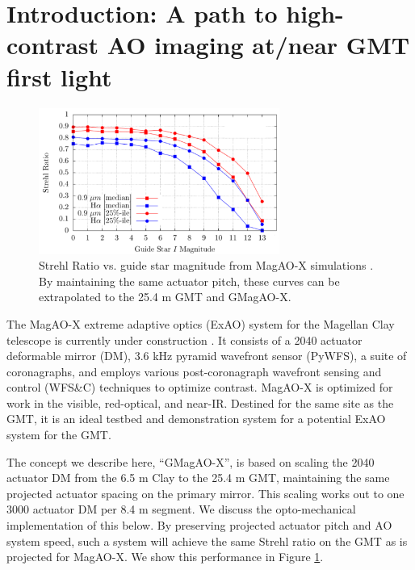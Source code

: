 \documentclass[12pt,preprint]{aastex}
\begin{document}
\section{Introduction: A path to high-contrast AO imaging at/near GMT first light} \label{sec:intro}

\begin{figure}
\centering
\vspace{-0.3in}
\includegraphics[width=3.1in]{figures/fig1.png}
\vspace{-0.1in}
\caption{ Strehl Ratio vs. guide star magnitude from MagAO-X simulations \citep{2018SPIE10703E..09M}.  By maintaining the same actuator pitch, these curves can be extrapolated to the 25.4 m GMT and GMagAO-X. \label{fig:strehl} }
\end{figure}

The MagAO-X extreme adaptive optics (ExAO) system for the Magellan Clay telescope is currently under construction \citep{2018SPIE10703E..09M, 2018SPIE10703E..4YC}.  It consists of a 2040 actuator deformable mirror (DM), 3.6 kHz pyramid wavefront sensor (PyWFS), a suite of coronagraphs, and employs various post-coronagraph wavefront sensing and control (WFS\&C) techniques to optimize contrast.  MagAO-X is optimized for work in the visible, red-optical, and near-IR.  Destined for the same site as the GMT, it is an ideal testbed and demonstration system for a potential ExAO system for the GMT.

The concept we describe here, ``GMagAO-X'', is based on scaling the 2040 actuator DM from the 6.5 m Clay to the 25.4 m GMT, maintaining the same projected actuator spacing on the primary mirror.  This scaling works out to one 3000 actuator DM per 8.4 m segment.  We discuss the opto-mechanical implementation of this below.  By preserving projected actuator pitch and AO system speed, such a system will achieve the same Strehl ratio on the GMT as is projected for MagAO-X.  We show this performance in Figure \ref{fig:strehl}.
\end{document}
